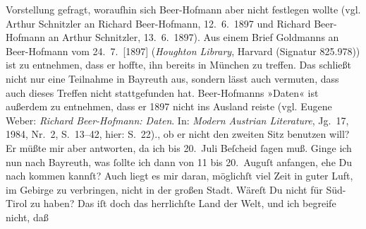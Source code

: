 \begin{ledgroupsized}[t]{13cm}
{{{                  Vorstellung gefragt, woraufhin sich Beer-Hofmann aber nicht festlegen wollte (vgl. Arthur Schnitzler an Richard Beer-Hofmann, 12. 6. 1897 und Richard Beer-Hofmann an Arthur Schnitzler, 13. 6. 1897). Aus einem Brief Goldmanns an Beer-Hofmann vom
                     24. 7. {[}1897{]} (\emph{Houghton Library},
                     Harvard (Signatur 825.978)) ist zu entnehmen, dass
                  er hoffte, ihn bereits in München zu
                  treffen. Das schließt nicht nur eine Teilnahme in Bayreuth aus, sondern lässt auch vermuten, dass auch dieses Treffen nicht
                  stattgefunden hat. Beer-Hofmanns »Daten«
                  ist außerdem zu entnehmen, dass er 1897 nicht ins Ausland
                  reiste (vgl. Eugene Weber: \emph{Richard Beer-Hofmann:
                        Daten}. In: \emph{Modern Austrian Literature},
                     Jg. 17, 1984, Nr. 2, S. 13–42, hier:
                  S. 22).}}}\label{K_L02817-3h}, ob er nicht den zweiten Sitz benutzen will? Er müßte mir
               aber  antworten, da ich bis 20. Juli Beſcheid ſagen muß. Ginge ich nun nach Bayreuth, was ſollte ich dann von 11 bis 20. Auguſt
               anfangen, ehe Du nach \label{K_L02817-4v}\label{K_L02817-4h} kommen kannſt? Auch liegt es mir daran, möglichſt viel
               Zeit in guter Luft, im Gebirge zu verbringen, nicht in der großen Stadt. {\pb}Wäreſt Du nicht für Süd-Tirol zu haben? Das iſt doch das herrlichſte Land der Welt, und ich begreife nicht, daß

\end{ledgroupsized}
